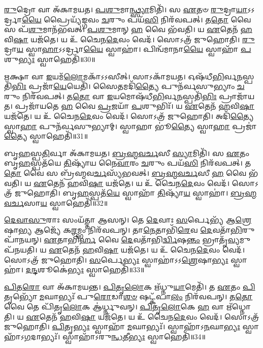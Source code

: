 \-\ul{𑌰𑍁}\-𑌦𑍍𑌰𑍋 𑌵𑌾 𑌅᳴𑌕𑌾𑌮𑌯𑌤।
\-\ul{𑌪}\-\-\ul{𑌶𑍁}\-𑌮𑌾\-\ul{𑌨𑍍𑌥𑍍𑌸𑍍𑌯𑌾}\-𑌮𑌿𑌤𑌿᳴।
𑌸 \ul{𑌏}\-𑌤𑍞 \ul{𑌰𑍁}\-𑌦𑍍𑌰𑌾\-\ul{𑌯𑌾}\-𑌽𑌽𑌰𑍍𑌦𑍍𑌰𑌾\-\ul{𑌯𑍈} 𑌪𑍍𑌰𑍈𑌯𑍍𑌯᳴𑌙𑍍𑌗𑌵𑌂 \ul{𑌚}\-𑌰𑍁𑌂 𑌪𑌯᳴\-\ul{𑌸𑌿} 𑌨𑌿𑌰᳴𑌵𑌪𑌤𑍍।
𑌤\-\ul{𑌤𑍋} 𑌵𑍈 𑌸 𑌪᳴\-\ul{𑌶𑍁}\-𑌮𑌾𑌨᳴𑌭𑌵𑌤𑍍।
\-\ul{𑌪}\-\-\ul{𑌶𑍁}\-𑌮𑌾𑌨𑍍 \ul{𑌹} 𑌵𑍈 𑌭᳴𑌵𑌤𑌿।
𑌯 \ul{𑌏}\-𑌤𑍇𑌨᳴ \ul{𑌹}\-𑌵𑌿\-\ul{𑌷𑌾} 𑌯𑌜᳴𑌤𑍇।
𑌯 𑌉᳴ 𑌚𑍈𑌨\-\ul{𑌦𑍇}\-𑌵𑌂 𑌵𑍇𑌦᳴।
𑌸𑍋𑌽𑌤𑍍𑌰᳴ 𑌜𑍁𑌹𑍋𑌤𑌿।
\-\ul{𑌰𑍁}\-𑌦𑍍𑌰𑌾\-\ul{𑌯} 𑌸𑍍𑌵𑌾\-\ul{𑌹𑌾}\-\-𑌽𑌽𑌰𑍍𑌦𑍍𑌰𑌾\-\ul{𑌯𑍈} 𑌸𑍍𑌵𑌾𑌹𑌾॑।
𑌪𑌿𑌨𑍍𑌵᳴𑌮𑌾𑌨𑌾\-\ul{𑌯𑍈} 𑌸𑍍𑌵𑌾𑌹𑌾᳴ \ul{𑌪}\-𑌶𑍁\-\ul{𑌭𑍍𑌯𑌃} 𑌸𑍍𑌵𑌾𑌹𑍇𑌤𑌿᳴॥30॥

\-\ul{𑌋}\-𑌕𑍍𑌷𑌾 𑌵𑌾 \ul{𑌇}\-𑌯𑌮᳴\-\ul{𑌲𑍋}\-𑌮𑌕𑌾᳴\-𑌽𑌽𑌸𑍀𑌤𑍍।
𑌸𑌾𑌽𑌕𑌾᳴𑌮𑌯𑌤।
𑌓𑌷᳴𑌧𑍀\-\ul{𑌭𑌿}\-𑌰𑍍𑌵\-\ul{𑌨}\-\-𑌸𑍍𑌪𑌤𑌿᳴\-\ul{𑌭𑌿𑌃} 𑌪𑍍𑌰𑌜𑌾᳴\-\ul{𑌯𑍇}\-𑌯𑍇𑌤𑌿᳴।
𑌸𑍈𑌤𑌮𑌦𑌿᳴\-\ul{𑌤𑍍𑌯𑍈} 𑌪𑍁𑌨᳴𑌰𑍍𑌵𑌸𑍁𑌭𑍍𑌯𑌾𑌂 \ul{𑌚}\-𑌰𑍁𑌂 𑌨𑌿𑌰᳴𑌵𑌪𑌤𑍍।
𑌤\-\ul{𑌤𑍋} 𑌵𑌾 \ul{𑌇}\-𑌯𑌮𑍋𑌷᳴𑌧𑍀\-\ul{𑌭𑌿}\-𑌰𑍍𑌵\-\ul{𑌨}\-𑌸𑍍𑌪𑌤𑌿᳴\-\ul{𑌭𑌿𑌃} 𑌪𑍍𑌰𑌾𑌜𑌾᳴𑌯𑌤।
𑌪𑍍𑌰𑌜𑌾᳴𑌯𑌤𑍇 \ul{𑌹} 𑌵𑍈 \ul{𑌪𑍍𑌰}\-𑌜𑌯𑌾᳴ \ul{𑌪}\-𑌶𑍁𑌭𑌿𑌃᳴।
𑌯 \ul{𑌏}\-𑌤𑍇𑌨᳴ \ul{𑌹}\-𑌵𑌿\-\ul{𑌷𑌾} 𑌯𑌜᳴𑌤𑍇।
𑌯 𑌉᳴ 𑌚𑍈𑌨\-\ul{𑌦𑍇}\-𑌵𑌂 𑌵𑍇𑌦᳴।
𑌸𑍋𑌽𑌤𑍍𑌰᳴ 𑌜𑍁𑌹𑍋𑌤𑌿।
𑌅𑌦𑌿᳴\-\ul{𑌤𑍍𑌯𑍈} 𑌸𑍍𑌵𑌾\-\ul{𑌹𑌾} 𑌪𑍁𑌨᳴𑌰𑍍𑌵𑌸𑍁𑌭𑍍𑌯𑌾𑌮𑍍।
𑌸𑍍𑌵𑌾𑌹𑌾 𑌭𑍂॑\-\ul{𑌤𑍍𑌯𑍈} 𑌸𑍍𑌵𑌾\-\ul{𑌹𑌾} 𑌪𑍍𑌰𑌜𑌾॑\-\ul{𑌤𑍍𑌯𑍈} 𑌸𑍍𑌵𑌾𑌹𑍇𑌤𑌿᳴॥31॥

𑌬𑍃\-\ul{𑌹}\-𑌸𑍍𑌪\-\ul{𑌤𑌿}\-𑌰𑍍𑌵𑌾 𑌅᳴𑌕𑌾𑌮𑌯𑌤।
\-\ul{𑌬𑍍𑌰}\-\-\ul{𑌹𑍍𑌮}\-\-\ul{𑌵}\-\-\ul{𑌰𑍍𑌚}\-𑌸𑍀 \ul{𑌸𑍍𑌯𑌾}\-𑌮𑌿𑌤𑌿᳴।
𑌸 \ul{𑌏}\-𑌤𑌂 𑌬𑍃\-\ul{𑌹}\-𑌸𑍍𑌪𑌤᳴𑌯𑍇 \ul{𑌤𑌿}\-𑌷𑍍𑌯𑌾᳴𑌯 𑌨𑍈\-\ul{𑌵𑌾}\-𑌰𑌂 \ul{𑌚}\-𑌰𑍁𑌂 𑌪𑌯᳴\-\ul{𑌸𑌿} 𑌨𑌿𑌰᳴𑌵𑌪𑌤𑍍।
𑌤\-\ul{𑌤𑍋} 𑌵𑍈 𑌸 𑌬𑍍𑌰᳴𑌹𑍍𑌮𑌵\-\ul{𑌰𑍍𑌚}\-𑌸𑍍𑌯᳴𑌭𑌵𑌤𑍍।
\-\ul{𑌬𑍍𑌰}\-\-\ul{𑌹𑍍𑌮}\-\-\ul{𑌵}\-\-\ul{𑌰𑍍𑌚}\-𑌸𑍀 \ul{𑌹} 𑌵𑍈 𑌭᳴𑌵𑌤𑌿।
𑌯 \ul{𑌏}\-𑌤𑍇𑌨᳴ \ul{𑌹}\-𑌵𑌿\-\ul{𑌷𑌾} 𑌯𑌜᳴𑌤𑍇।
𑌯 𑌉᳴ 𑌚𑍈𑌨\-\ul{𑌦𑍇}\-𑌵𑌂 𑌵𑍇𑌦᳴।
𑌸𑍋𑌽𑌤𑍍𑌰᳴ 𑌜𑍁𑌹𑍋𑌤𑌿।
𑌬𑍃\-\ul{𑌹}\-𑌸𑍍𑌪𑌤᳴\-\ul{𑌯𑍇} 𑌸𑍍𑌵𑌾𑌹𑌾᳴ \ul{𑌤𑌿}\-𑌷𑍍𑌯𑌾᳴\-\ul{𑌯} 𑌸𑍍𑌵𑌾𑌹𑌾॑।
\-\ul{𑌬𑍍𑌰}\-\-\ul{𑌹𑍍𑌮}\-\-\ul{𑌵}\-\-\ul{𑌰𑍍𑌚}\-𑌸𑌾\-\ul{𑌯} 𑌸𑍍𑌵𑌾𑌹𑍇𑌤𑌿᳴॥32॥

\-\ul{𑌦𑍇}\-\-\ul{𑌵𑌾}\-\-\ul{𑌸𑍁}\-𑌰𑌾𑌃 𑌸𑌂𑌯᳴𑌤𑍍𑌤𑌾 𑌆𑌸𑌨𑍍।
𑌤𑍇 \ul{𑌦𑍇}\-𑌵𑌾𑌃 \ul{𑌸}\-𑌰𑍍𑌪𑍇𑌭𑍍𑌯᳴ 𑌆\-\ul{𑌶𑍍𑌰𑍇}\-𑌷𑌾\-\ul{𑌭𑍍𑌯} 𑌆𑌜𑍍𑌯𑍇᳴ 𑌕\-\ul{𑌰}\-𑌮𑍍𑌭𑌂 𑌨𑌿𑌰᳴𑌵𑌪𑌨𑍍।
𑌤𑌾\-\ul{𑌨𑍇}\-𑌤𑌾𑌭𑌿᳴\-\ul{𑌰𑍇}\-𑌵 \ul{𑌦𑍇}\-𑌵𑌤𑌾᳴\-\ul{𑌭𑌿}\-𑌰𑍁𑌪𑌾᳴𑌨𑌯𑌨𑍍।
\-\ul{𑌏}\-𑌤𑌾𑌭𑌿᳴\-\ul{𑌰𑍍𑌹} 𑌵𑍈 \ul{𑌦𑍇}\-𑌵𑌤𑌾᳴𑌭𑌿\-\ul{𑌰𑍍𑌦𑍍𑌵𑌿}\-𑌷\-\ul{𑌨𑍍𑌤𑌂} 𑌭𑍍𑌰𑌾𑌤𑍃᳴\-\ul{𑌵𑍍𑌯}\-𑌮𑍁𑌪᳴𑌨𑌯𑌤𑌿।
𑌯 \ul{𑌏}\-𑌤𑍇𑌨᳴ \ul{𑌹}\-𑌵𑌿\-\ul{𑌷𑌾} 𑌯𑌜᳴𑌤𑍇।
𑌯 𑌉᳴ 𑌚𑍈𑌨\-\ul{𑌦𑍇}\-𑌵𑌂 𑌵𑍇𑌦᳴।
𑌸𑍋𑌽𑌤𑍍𑌰᳴ 𑌜𑍁𑌹𑍋𑌤𑌿।
\-\ul{𑌸}\-𑌰𑍍𑌪𑍇\-\ul{𑌭𑍍𑌯𑌃} 𑌸𑍍𑌵𑌾𑌹𑌾॑\-𑌽𑌽\-\ul{𑌶𑍍𑌰𑍇}\-𑌷𑌾\-\ul{𑌭𑍍𑌯𑌃} 𑌸𑍍𑌵𑌾𑌹𑌾॑।
\-\ul{𑌦}\-\-\ul{𑌨𑍍𑌦}\-𑌶𑍂𑌕𑍇॑\-\ul{𑌭𑍍𑌯𑌃} 𑌸𑍍𑌵𑌾𑌹𑍇𑌤𑌿᳴॥33॥

\-\ul{𑌪𑌿}\-𑌤\-\ul{𑌰𑍋} 𑌵𑌾 𑌅᳴𑌕𑌾𑌮𑌯𑌨𑍍𑌤।
\-\ul{𑌪𑌿}\-\-\ul{𑌤𑍃}\-\-\ul{𑌲𑍋}\-𑌕 𑌋᳴𑌧𑍍𑌨𑍁\-\ul{𑌯𑌾}\-𑌮𑍇𑌤𑌿᳴।
𑌤 \ul{𑌏}\-𑌤𑌂 \ul{𑌪𑌿}\-𑌤𑍃𑌭𑍍𑌯𑍋᳴ \ul{𑌮}\-𑌘𑌾𑌭𑍍𑌯𑌃᳴ 𑌪𑍁\-\ul{𑌰𑍋}\-𑌡𑌾\-\ul{𑌶}\-\-\ul{𑍞} 𑌷𑌟𑍍𑌕᳴𑌪𑌾\-\ul{𑌲𑌂} 𑌨𑌿𑌰᳴𑌵𑌪𑌨𑍍।
𑌤\-\ul{𑌤𑍋} 𑌵𑍈 𑌤𑍇 𑌪𑌿᳴𑌤𑍃\-\ul{𑌲𑍋}\-𑌕 𑌆॑𑌰𑍍𑌧𑍍𑌨𑍁𑌵𑌨𑍍।
\-\ul{𑌪𑌿}\-\-\ul{𑌤𑍃}\-\-\ul{𑌲𑍋}\-𑌕𑍇 \ul{𑌹} 𑌵𑌾 𑌋᳴𑌧𑍍𑌨𑍋𑌤𑌿।
𑌯 \ul{𑌏}\-𑌤𑍇𑌨᳴ \ul{𑌹}\-𑌵𑌿\-\ul{𑌷𑌾} 𑌯𑌜᳴𑌤𑍇।
𑌯 𑌉᳴ 𑌚𑍈𑌨\-\ul{𑌦𑍇}\-𑌵𑌂 𑌵𑍇𑌦᳴।
𑌸𑍋𑌽𑌤𑍍𑌰᳴ 𑌜𑍁𑌹𑍋𑌤𑌿।
\-\ul{𑌪𑌿}\-𑌤𑍃\-\ul{𑌭𑍍𑌯𑌃} 𑌸𑍍𑌵𑌾𑌹𑌾᳴ \ul{𑌮}\-𑌘𑌾𑌭𑍍𑌯𑌃᳴।
𑌸𑍍𑌵𑌾𑌹𑌾᳴\-𑌽\-\ul{𑌨}\-𑌘𑌾\-\ul{𑌭𑍍𑌯𑌃} 𑌸𑍍𑌵𑌾𑌹𑌾᳴𑌽\-\ul{𑌗}\-𑌦𑌾𑌭𑍍𑌯𑌃᳴।
𑌸𑍍𑌵𑌾𑌹𑌾᳴\-𑌽𑌰𑍁\-\ul{𑌨𑍍𑌧}\-𑌤𑍀\-\ul{𑌭𑍍𑌯𑌃} 𑌸𑍍𑌵𑌾𑌹𑍇𑌤𑌿᳴॥34॥

